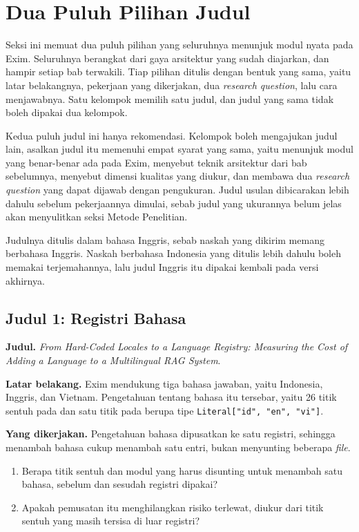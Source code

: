 \section{Dua Puluh Pilihan Judul}

Seksi ini memuat dua puluh pilihan yang seluruhnya menunjuk modul nyata pada
Exim. Seluruhnya berangkat dari gaya arsitektur yang sudah diajarkan, dan
hampir setiap bab terwakili. Tiap pilihan ditulis dengan bentuk yang sama, yaitu latar belakangnya,
pekerjaan yang dikerjakan, dua \textit{research question}, lalu cara
menjawabnya. Satu kelompok memilih satu judul, dan judul yang sama tidak boleh
dipakai dua kelompok.

Kedua puluh judul ini hanya rekomendasi. Kelompok boleh mengajukan judul lain,
asalkan judul itu memenuhi empat syarat yang sama, yaitu menunjuk modul yang
benar-benar ada pada Exim, menyebut teknik arsitektur dari bab sebelumnya,
menyebut dimensi kualitas yang diukur, dan membawa dua \textit{research
question} yang dapat dijawab dengan pengukuran. Judul usulan dibicarakan lebih
dahulu sebelum pekerjaannya dimulai, sebab judul yang ukurannya belum jelas
akan menyulitkan seksi Metode Penelitian.

Judulnya ditulis dalam bahasa Inggris, sebab naskah yang dikirim memang
berbahasa Inggris. Naskah berbahasa Indonesia yang ditulis lebih dahulu boleh
memakai terjemahannya, lalu judul Inggris itu dipakai kembali pada versi
akhirnya.

\subsection*{Judul 1: Registri Bahasa}

\textbf{Judul.} \textit{From Hard-Coded Locales to a Language Registry: Measuring the Cost of Adding a Language to a Multilingual RAG System}.

\textbf{Latar belakang.} Exim mendukung tiga bahasa jawaban, yaitu Indonesia,
Inggris, dan Vietnam. Pengetahuan tentang bahasa itu tersebar, yaitu 26 titik
sentuh pada  dan satu titik pada 
berupa tipe \texttt{Literal["id", "en", "vi"]}.

\textbf{Yang dikerjakan.} Pengetahuan bahasa dipusatkan ke satu registri,
sehingga menambah bahasa cukup menambah satu entri, bukan menyunting beberapa
\textit{file}.

\begin{enumerate}
  \item Berapa titik sentuh dan modul yang harus disunting untuk menambah satu
    bahasa, sebelum dan sesudah registri dipakai?
  \item Apakah pemusatan itu menghilangkan risiko terlewat, diukur dari titik
    sentuh yang masih tersisa di luar registri?
\end{enumerate}

